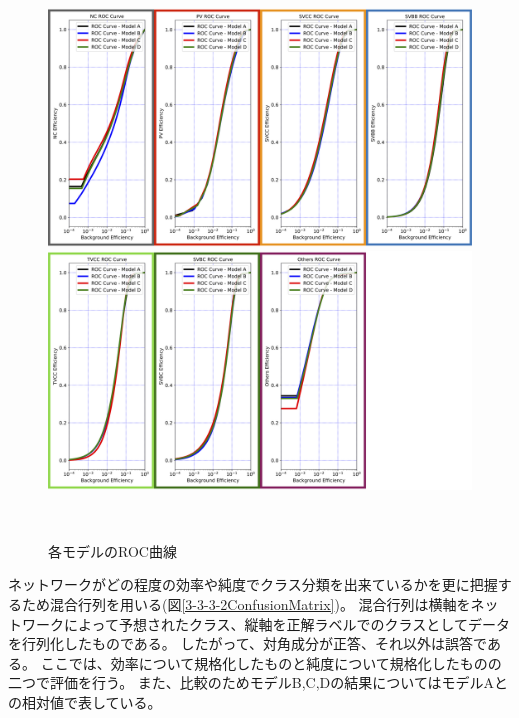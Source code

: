 \begin{figure}[htbp]
 \centering
  \begin{minipage}{1.0\textwidth}
   \centering
    \includegraphics[width=1.0\textwidth, clip]{Figure/3Networks/3-3-3-2ROC_Curve_1.png}
   \end{minipage}
   
   \begin{minipage}{1.0\textwidth}
   \centering
    \includegraphics[width=1.0\textwidth, clip]{Figure/3Networks/3-3-3-2ROC_Curve_2.png}
   \end{minipage}
  \caption{各モデルのROC曲線}
  \label{3-3-3-2ROC_Curve}
\end{figure}

ネットワークがどの程度の効率や純度でクラス分類を出来ているかを更に把握するため混合行列を用いる(図\ref{3-3-3-2ConfusionMatrix})。
混合行列は横軸をネットワークによって予想されたクラス、縦軸を正解ラベルでのクラスとしてデータを行列化したものである。
したがって、対角成分が正答、それ以外は誤答である。
ここでは、効率について規格化したものと純度について規格化したものの二つで評価を行う。
また、比較のためモデルB,C,Dの結果についてはモデルAとの相対値で表している。

